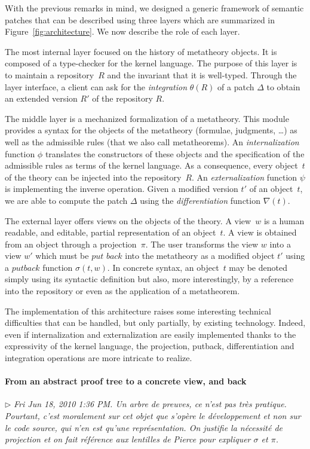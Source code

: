 \documentclass{article}
\newcommand{\remtext}[1]{\textcolor{bwgreen}{$\triangleright$ \textsl{#1}}}
\begin{document}
With the previous remarks in mind, we designed a generic framework of semantic
patches that can be described using three layers which are summarized in 
Figure~\ref{fig:architecture}. We now describe the role of each layer.

The most internal layer focused on the history of metatheory
objects. It is composed of a type-checker for the kernel language. The
purpose of this layer is to maintain a repository~$R$ and the
invariant that it is well-typed. Through the layer interface, a client
can ask for the \textit{integration} $\theta(R)$ of a patch $\Delta$
to obtain an extended version $R'$ of the repository $R$.

The middle layer is a mechanized formalization of a metatheory. This
module provides a syntax for the objects of the metatheory (formulae,
judgments, \ldots) as well as the admissible rules (that we also call
metatheorems).  An \textit{internalization} function $\phi$ translates
the constructors of these objects and the specification of the
admissible rules as terms of the kernel language. As a consequence,
every object~$t$ of the theory can be injected into the
repository~$R$. An \textit{externalization} function $\psi$ is
implementing the inverse operation. Given a modified version $t'$ of
an object~$t$, we are able to compute the patch $\Delta$ using
the \textit{differentiation} function $\nabla(t)$. 

The external layer offers views on the objects of the theory. A
view~$w$ is a human readable, and editable, partial representation of
an object~$t$. A view is obtained from an object through a
projection~$\pi$.  The user transforms the view $w$ into a view $w'$
which must be $\textit{put back}$ into the metatheory as a modified
object $t'$ using a $\textit{putback}$ function $\sigma(t, w)$.  In
concrete syntax, an object~$t$ may be denoted simply using its
syntactic definition but also, more interestingly, by a reference into
the repository or even as the application of a metatheorem.

The implementation of this architecture raises some interesting
technical difficulties that can be handled, but only partially, 
by existing technology. Indeed, even if internalization and 
externalization are easily implemented thanks to the expressivity
of the kernel language, the projection, putback, differentiation
and integration operations are more intricate to realize. 

\paragraph{From an abstract proof tree to a concrete view, and back}
\-
\remtext{Fri Jun 18, 2010  1:36 PM. Un arbre de preuves, ce n'est
  pas très pratique. Pourtant, c'est moralement sur cet objet 
  que s'opère le développement et non sur le code source, qui
  n'en est qu'une représentation. On justifie la nécessité de
  projection et on fait référence aux lentilles de Pierce pour
  expliquer $\sigma$ et $\pi$.}
\end{document}
